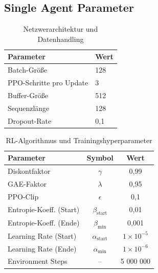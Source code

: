 \subsection{Single Agent Parameter}
\begin{table}[H]
  \centering
  \caption{Netzwerarchitektur und Datenhandling}
  \label{tab:network_architecture}
  \begin{tabular}{ll}
    \toprule
    Parameter             & Wert     \\
    \midrule
    Batch-Größe           & 128       \\
    PPO-Schritte pro Update & 3         \\
    Buffer-Größe          & 512      \\
    Sequenzlänge          & 128      \\
    Dropout-Rate          & 0{,}1    \\
    \bottomrule
  \end{tabular}
\end{table}

\begin{table}[htbp]
  \centering
  \caption{RL-Algorithmus und Trainingshyperparameter}
  \label{tab:rl_hyperparams}
  \begin{tabular}{@{}lcc@{}}
    \toprule
    Parameter                            & Symbol                  & Wert       \\
    \midrule
    Diskontfaktor                        & \(\gamma\)              & 0,99       \\
    GAE-Faktor                           & \(\lambda\)             & 0,95       \\
    PPO-Clip                             & \(\epsilon\)            & 0,1        \\
    Entropie-Koeff. (Start)             & \(\beta_{\mathrm{start}}\)   & 0,01       \\
    Entropie-Koeff. (Ende)              & \(\beta_{\mathrm{min}}\)     & 0,001      \\
    Learning Rate (Start)               & \(\alpha_{\mathrm{start}}\)  & \(1\times10^{-5}\)  \\
    Learning Rate (Ende)                & \(\alpha_{\mathrm{min}}\)    & \(1\times10^{-6}\)  \\
    Environment Steps                   & –                       & 5 000 000  \\
    \bottomrule
  \end{tabular}
\end{table}

